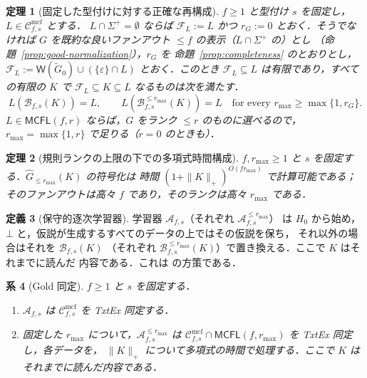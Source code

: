 \documentclass[11pt,a4paper]{ltjsarticle}
\numberwithin{equation}{section}
\theoremstyle{plain}
\newtheorem{theorem}{定理}[section]
\newtheorem{corollary}[theorem]{系}
\theoremstyle{definition}
\newtheorem{definition}[theorem]{定義}
\theoremstyle{remark}
\newcommand{\Wit}{\mathsf{W}}
\newcommand{\Cmcf}[2]{\mathcal{C}^{\mathrm{mcf}}_{#1,#2}}
\newcommand{\eps}{\varepsilon}
\newcommand{\pausesym}{\bot}
\theoremstyle{plain}
\begin{document}
\begin{theorem}[固定した型付けに対する正確な再構成]
\label{thm:exact-reconstruction}
$f\ge1$ と型付け $s$ を固定し，$L\in\Cmcf{f}{s}$ とする．
$L\cap\Sigma^+=\emptyset$ ならば $\mathcal F_L:=L$ かつ $r_G:=0$ とおく．そうでなければ $G$
を既約な良いファンアウト $\le f$ の表示（$L\cap\Sigma^+$ の）とし
（命題~\ref{prop:good-normalization}），$r_G$ を
命題~\ref{prop:completeness} のとおりとし，
$\mathcal F_L:=\Wit(\widetilde G_0)\cup(\{\eps\}\cap L)$ とおく．このとき
$\mathcal F_L\subseteq L$ は有限であり，すべての有限の $K$ で
$\mathcal F_L\subseteq K\subseteq L$ なるものは次を満たす．
\[
 L(\mathcal B_{f,s}(K))=L,\qquad
 L(\mathcal B_{f,s}^{\le r_{\max}}(K))=L\quad
 \text{for every }r_{\max}\ge\max\{1,r_G\}.
\]
$L\in\mathsf{MCFL}(f,r)$ ならば，$G$ をランク $\le r$ のものに選べるので，
$r_{\max}=\max\{1,r\}$ で足りる（$r=0$ のときも）．
\end{theorem}

\begin{theorem}[規則ランクの上限の下での多項式時間構成]
\label{thm:poly}
$f,r_{\max}\ge1$ と $s$ を固定する．$\widehat G_{\le r_{\max}}(K)$ の符号化は
時間 $(1+\|K\|_+)^{O(fr_{\max})}$ で計算可能である；そのファンアウトは高々 $f$
であり，そのランクは高々 $r_{\max}$ である．
\end{theorem}

\begin{definition}[保守的逐次学習器]
\label{def:conservative-learner}
学習器 $\mathcal A_{f,s}$（それぞれ $\mathcal A_{f,s}^{\le r_{\max}}$）
は $H_0$ から始め，$\pausesym$ と，仮説が生成するすべてのデータの上ではその仮説を保ち，
それ以外の場合はそれを $\mathcal B_{f,s}(K)$
（それぞれ $\mathcal B_{f,s}^{\le r_{\max}}(K)$）で置き換える．ここで $K$ はそれまでに読んだ
内容である．これは \cite[Algorithm~1]{Yoshinaka2011} の方策である．
\end{definition}

\begin{corollary}[Gold 同定]
\label{cor:gold-explanatory}
\label{cor:capped-gold-poly}
$f\ge1$ と $s$ を固定する．
\begin{enumerate}[label=\textup{(\roman*)}]
\item $\mathcal A_{f,s}$ は $\Cmcf{f}{s}$ を TxtEx 同定する．
\item 固定した $r_{\max}$ について，$\mathcal A_{f,s}^{\le r_{\max}}$ は
$\Cmcf{f}{s}\cap\mathsf{MCFL}(f,r_{\max})$ を TxtEx 同定し，各データを，
$\|K\|_+$ について多項式の時間で処理する．ここで $K$ はそれまでに読んだ内容である．
\end{enumerate}
\end{corollary}
\end{document}
